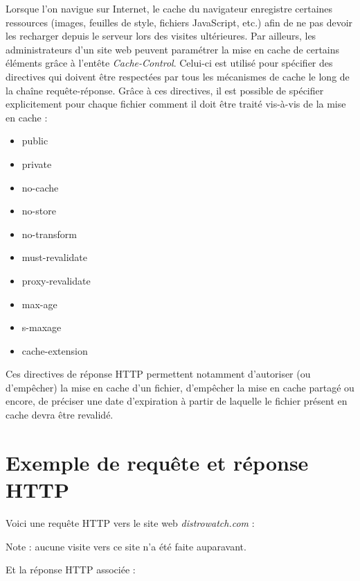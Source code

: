 Lorsque l'on navigue sur Internet, le cache du navigateur enregistre certaines ressources (images, feuilles de style, fichiers JavaScript, etc.) afin de ne pas devoir les recharger depuis le serveur lors des visites ultérieures. Par ailleurs, les administrateurs d'un site web peuvent paramétrer la mise en cache de certains éléments grâce à l'entête \textit{Cache-Control}. Celui-ci est utilisé pour spécifier des directives qui doivent être respectées par tous les mécanismes de cache le long de la chaîne requête-réponse. Grâce à ces directives, il est possible de spécifier explicitement pour chaque fichier comment il doit être traité vis-à-vis de la mise en cache \cite{IETF_RFC2616} :
\begin{multicols}{2}
\begin{itemize}
  \item public
  \item private
  \item no-cache
  \item no-store
  \item no-transform
  \item must-revalidate
  \item proxy-revalidate
  \item max-age
  \item s-maxage
  \item cache-extension
\end{itemize}
\end{multicols}

Ces directives de réponse HTTP permettent notamment d'autoriser (ou d'empêcher) la mise en cache d'un fichier, d'empêcher la mise en cache partagé ou encore, de préciser une date d'expiration à partir de laquelle le fichier présent en cache devra être revalidé.


\section{Exemple de requête et réponse HTTP}
\label{http_request_example}
Voici une requête HTTP vers le site web \textit{distrowatch.com} :

\begin{singlespacing}

\end{singlespacing}
Note : aucune visite vers ce site n'a été faite auparavant.
\newline

Et la réponse HTTP associée :

